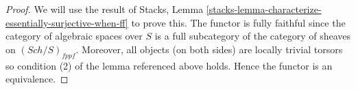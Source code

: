 \documentclass[10pt,a4paper]{amsart}
\theoremstyle{plain}
\theoremstyle{definition}
\theoremstyle{remark}
\numberwithin{equation}{subsection}
\def\Sch{\mathit{Sch}}
\begin{document}
\begin{proof}
We will use the result of
Stacks, Lemma \ref{stacks-lemma-characterize-essentially-surjective-when-ff}
to prove this. The functor is fully faithful since the category of
algebraic spaces over $S$ is a full subcategory of the category of
sheaves on $(\Sch/S)_{fppf}$.
Moreover, all objects (on both sides) are locally trivial torsors
so condition (2) of the lemma referenced above holds.
Hence the functor is an equivalence.
\end{proof}
\end{document}
